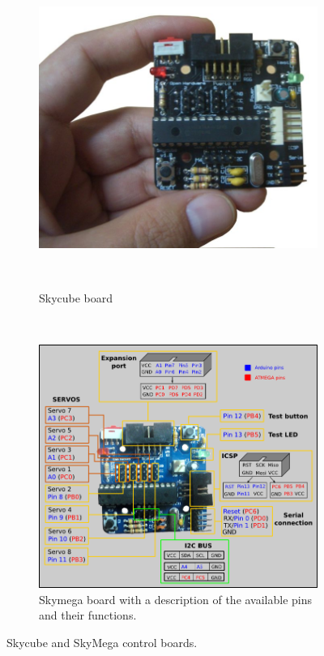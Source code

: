 \begin{figure}[h]
		\centering
        \begin{subfigure}[b]{0.46\textwidth}
                \centering
                \includegraphics[width=\textwidth]{images/Hardware_skycube.jpg}
                \caption{Skycube board}~\\
                \label{fig:hardware_skycube}
        \end{subfigure}
        ~
        \begin{subfigure}[b]{0.46\textwidth}
                \centering
                \includegraphics[width=\textwidth]{images/Hardware_skymega_pins.png}
                \caption{Skymega board with a description of the available pins and their functions.}
                \label{fig:hardware_skymega}
        \end{subfigure}
        \caption{Skycube and SkyMega control boards.} 
        \label{fig:hardware_previouswork_boards}
\end{figure}


